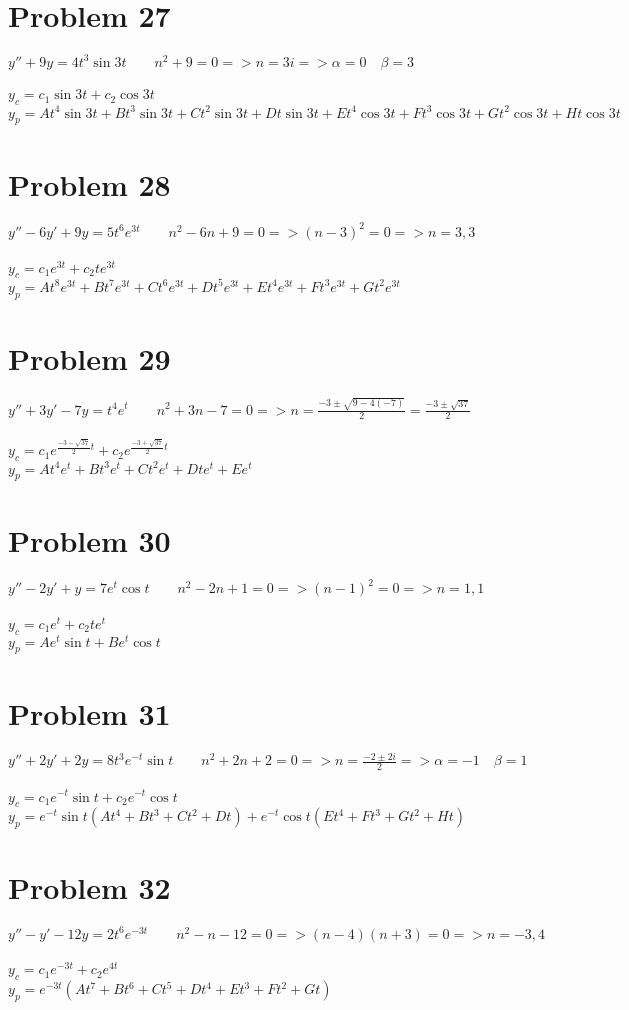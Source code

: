 \documentclass[12pt]{exam}
\begin{document}
\section*{Problem 27}
$y''+9y=4t^3\sin{3t}\qquad n^2+9=0=>n=3i=>\alpha=0\quad\beta=3$\\\\
$y_c=c_1\sin{3t}+c_2\cos{3t}$\\
$y_p=At^4\sin{3t}+Bt^3\sin{3t}+Ct^2\sin{3t}+Dt\sin{3t}+Et^4\cos{3t}+Ft^3\cos{3t}+Gt^2\cos{3t}+Ht\cos{3t}$
\section*{Problem 28}
$y''-6y'+9y=5t^6e^{3t}\qquad n^2-6n+9=0=>(n-3)^2=0=>n=3,3$\\\\
$y_c=c_1e^{3t}+c_2te^{3t}$\\
$y_p=At^8e^{3t}+Bt^7e^{3t}+Ct^6e^{3t}+Dt^5e^{3t}+Et^4e^{3t}+Ft^3e^{3t}+Gt^2e^{3t}$
\section*{Problem 29}
$y''+3y'-7y=t^4e^t\qquad n^2+3n-7=0=>n=\frac{-3\pm\sqrt{9-4(-7)}}{2}=\frac{-3\pm\sqrt{37}}{2}$\\\\
$y_c=c_1e^{\frac{-3-\sqrt{37}}{2}t}+c_2e^{\frac{-3+\sqrt{37}}{2}t}$\\
$y_p=At^4e^t+Bt^3e^t+Ct^2e^t+Dte^t+Ee^t$
\section*{Problem 30}
$y''-2y'+y=7e^t\cos{t}\qquad n^2-2n+1=0=>(n-1)^2=0=>n=1,1$\\\\
$y_c=c_1e^t+c_2te^t$\\
$y_p=Ae^t\sin{t}+Be^t\cos{t}$
\section*{Problem 31}
$y''+2y'+2y=8t^3e^{-t}\sin{t}\qquad n^2+2n+2=0=>n=\frac{-2\pm2i}{2} =>\alpha=-1\quad\beta=1$\\\\
$y_c=c_1e^{-t}\sin{t}+c_2e^{-t}\cos{t}$\\
$y_p=e^{-t}\sin{t}(At^4+Bt^3+Ct^2+Dt)+e^{-t}\cos{t}(Et^4+Ft^3+Gt^2+Ht)$
\section*{Problem 32}
$y''-y'-12y=2t^6e^{-3t}\qquad n^2-n-12=0=>(n-4)(n+3)=0=>n=-3,4$\\\\
$y_c=c_1e^{-3t}+c_2e^{4t}$\\
$y_p=e^{-3t}(At^7+Bt^6+Ct^5+Dt^4+Et^3+Ft^2+Gt)$
\end{document}
